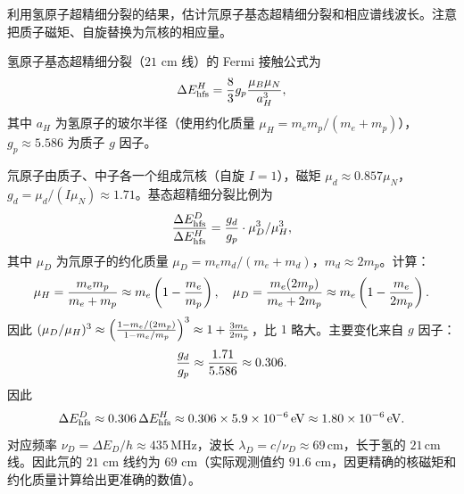 \begin{question}
利用氢原子超精细分裂的结果，估计氘原子基态超精细分裂和相应谱线波长。注意把质子磁矩、自旋替换为氘核的相应量。
\end{question}
\begin{solution}
氢原子基态超精细分裂（$21$ cm 线）的 Fermi 接触公式为
\[
\Delta E_{\rm hfs}^H = {8\over3}g_p{\mu_B\mu_N\over a_H^3},
\]
其中 $a_H$ 为氢原子的玻尔半径（使用约化质量 $\mu_H=m_e m_p/(m_e+m_p)$），$g_p\approx5.586$ 为质子 $g$ 因子。

氘原子由质子、中子各一个组成氘核（自旋 $I=1$），磁矩 $\mu_d\approx0.857\mu_N$，$g_d=\mu_d/(I\mu_N)\approx1.71$。基态超精细分裂比例为
\[
{\Delta E_{\rm hfs}^D\over\Delta E_{\rm hfs}^H}
= {g_d\over g_p}\cdot{\mu_D^3/\mu_H^3},
\]
其中 $\mu_D$ 为氘原子的约化质量 $\mu_D=m_e m_d/(m_e+m_d)$，$m_d\approx2m_p$。计算：
\[
\mu_H = {m_e m_p\over m_e+m_p}\approx m_e\left(1-{m_e\over m_p}\right),\quad
\mu_D = {m_e(2m_p)\over m_e+2m_p}\approx m_e\left(1-{m_e\over2m_p}\right).
\]
因此 $(\mu_D/\mu_H)^3 \approx \left({1-m_e/(2m_p)\over1-m_e/m_p}\right)^3 \approx 1 + {3m_e\over2m_p}$，比 $1$ 略大。主要变化来自 $g$ 因子：
\[
{g_d\over g_p} \approx {1.71\over5.586}\approx0.306.
\]
因此
\[
\Delta E_{\rm hfs}^D \approx 0.306\,\Delta E_{\rm hfs}^H \approx 0.306\times5.9\times10^{-6}\,\mathrm{eV} \approx 1.80\times10^{-6}\,\mathrm{eV}.
\]
对应频率 $\nu_D=\Delta E_D/h \approx 435\,\mathrm{MHz}$，波长 $\lambda_D=c/\nu_D \approx 69\,\mathrm{cm}$，长于氢的 $21\,\mathrm{cm}$ 线。因此氘的 $21$ cm 线约为 $69$ cm（实际观测值约 $91.6$ cm，因更精确的核磁矩和约化质量计算给出更准确的数值）。
\end{solution}

